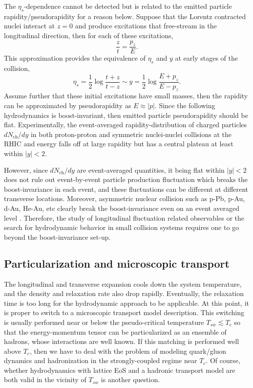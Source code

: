 The $\eta_s$-dependence cannot be detected but is related to the emitted particle rapidity/pseudorapidity for a reason below.
Suppose that the Lorentz contracted nuclei interact at $z=0$ and produce excitations that free-stream in the longitudinal direction, then for each of these excitations,
\begin{equation}
  \frac{z}{t} = \frac{p_z}{E}.
\end{equation}
This approximation provides the equivalence of $\eta_s$ and $y$ at early stages of the collision,
\begin{equation}
  \eta_s = \frac{1}{2}\log\frac{t+z}{t-z} \sim y = \frac{1}{2}\log\frac{E+p_z}{E-p_z}.
\end{equation}
Assume further that these initial excitations have small masses, then the rapidity can be approximated by pseudorapidity as $E\approx |p|$.
Since the following hydrodynamics is boost-invariant, then emitted particle pseudorapidity should be flat.
Experimentally, the event-averaged rapidity-distribution of charged particles $dN_{\textrm{ch}}/dy$ in both proton-proton and symmetric nuclei-nuclei collisions at the RHIC and energy falls off at large rapidity but has a central plateau at least within $|y|<2$.

However, since $dN_{\textrm{ch}}/dy$ are event-averaged quantities, it being flat within $|y|<2$ does not rule out event-by-event particle production fluctuation which breaks the boost-invariance in each event, and these fluctuations can be different at different transverse locations.
Moreover, asymmetric nuclear collision such as p-Pb, p-Au, d-Au, He-Au, etc clearly break the boost-invariance even on an event averaged level 
\cite{PhysRevLett.94.032301,Abelev:2014mda, Aad:2014lta, Aad:2013fja, CMS:2012qk, Chatrchyan:2013nka, Khachatryan:2015waa, Khachatryan:2015oea, Khachatryan:2016ibd, Adare:2014keg, Adare:2015cpn, Adare:2018toe}.
Therefore, the study of longitudinal fluctuation related observables or the search for hydrodynamic behavior in small collision systems requires one to go beyond the boost-invariance set-up.

\subsection{Particularization and microscopic transport}
The longitudinal and transverse expansion cools down the system temperature, and the density and relaxation rate also drop rapidly.
Eventually, the relaxation time is too long for the hydrodynamic approach to be applicable.
At this point, it is proper to switch to a microscopic transport model description.
This switching is usually performed near or below the pseudo-critical temperature $T_{sw} \lesssim T_c$ so that the energy-momentum tensor can be particularized as an ensemble of hadrons, whose interactions are well known.
If this matching is performed well above $T_c$, then we have to deal with the problem of modeling quark/gluon dynamics and hadronization in the strongly-coupled regime near $T_c$.
Of course, whether hydrodynamics with lattice EoS and a hadronic transport model are both valid in the vicinity of $T_{sw}$ is another question.

